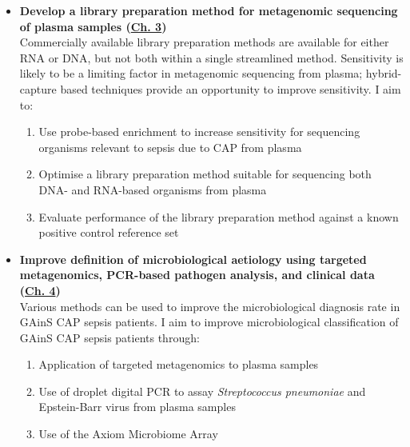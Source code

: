 \begin{itemize}[leftmargin=*]

\item	\textbf{Develop a library preparation method for metagenomic sequencing of plasma samples 
(\hyperref[ch:Results1]{Ch. 3})} \\
Commercially available library preparation methods are available for either RNA or DNA, but not both within a single streamlined method. Sensitivity is likely to be a limiting factor in metagenomic sequencing from plasma; hybrid-capture based techniques provide an opportunity to improve sensitivity. I aim to:

		\begin{enumerate}
		\item Use probe-based enrichment to increase sensitivity for sequencing organisms relevant to sepsis due to CAP from plasma
		\item Optimise a library preparation method suitable for sequencing both DNA- and RNA-based organisms from plasma
		\item Evaluate performance of the library preparation method against a known positive control reference set
		\end{enumerate}
		
\item	\textbf{Improve definition of microbiological aetiology using targeted metagenomics, PCR-based pathogen analysis, and clinical data (\hyperref[ch:Results2]{Ch. 4})} \\
Various methods can be used to improve the microbiological diagnosis rate in GAinS CAP sepsis patients. I aim to improve microbiological classification of GAinS CAP sepsis patients through:

		\begin{enumerate}
			\item Application of targeted metagenomics to plasma samples
			\item Use of droplet digital PCR to assay \textit{Streptococcus pneumoniae} and Epstein-Barr virus from plasma samples
			\item Use of the Axiom Microbiome Array
		\end{enumerate}


\end{itemize}
